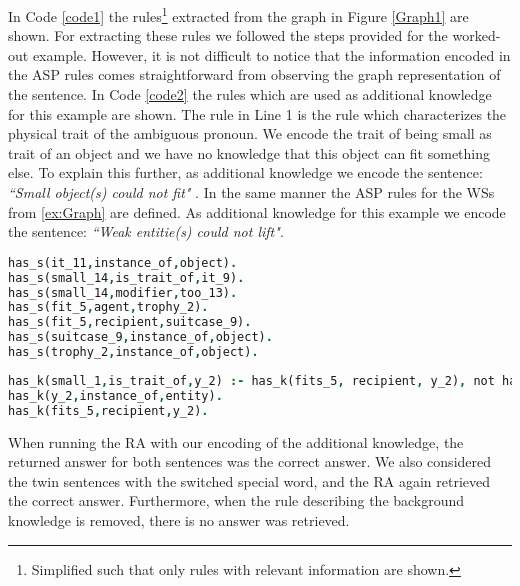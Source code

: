 In Code \ref{code1} the rules\footnote{Simplified such that only rules with relevant information are shown.} extracted from the graph in Figure \ref{Graph1} are shown. For extracting these rules we followed the steps provided for the worked-out example. However, it is not difficult to notice that the information encoded in the ASP rules comes straightforward from observing the graph representation of the sentence.
In Code \ref{code2} the rules which are used as additional knowledge for this example are shown. The rule in Line 1 is the rule which characterizes the physical trait of the ambiguous pronoun. We encode the trait of being small as trait of an object and we have no knowledge that this object can fit something else. To explain this further, as additional knowledge we encode the sentence: \textit{``Small object(s) could not fit" }.
In the same manner the ASP rules for the WSs from \ref{ex:Graph} are defined. As additional knowledge for this example we encode the sentence: \textit{``Weak entitie(s) could not lift"}.

\begin{lstlisting}[language = Prolog,  caption={Knowledge from S2},label=code1] 
has_s(it_11,instance_of,object).
has_s(small_14,is_trait_of,it_9).
has_s(small_14,modifier,too_13).
has_s(fit_5,agent,trophy_2).
has_s(fit_5,recipient,suitcase_9).
has_s(suitcase_9,instance_of,object).
has_s(trophy_2,instance_of,object).
\end{lstlisting}

\begin{lstlisting}[language = Prolog,  caption={Additional knowledge},label=code2]
has_k(small_1,is_trait_of,y_2) :- has_k(fits_5, recipient, y_2), not has_k(fits_5,modifier,could_3).
has_k(y_2,instance_of,entity).
has_k(fits_5,recipient,y_2).
\end{lstlisting}

When running the RA with our encoding of the additional knowledge, the returned answer for both sentences was the correct answer. We also considered the twin sentences with the switched special word, and the RA again retrieved the correct answer. Furthermore, when the rule describing the background knowledge is removed, there is no answer was retrieved. 









